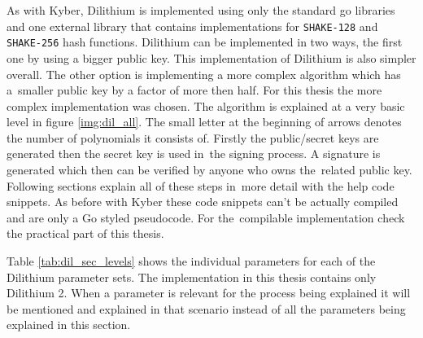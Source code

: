 As with Kyber, Dilithium is implemented using only the standard go libraries and one external library \cite{00fV2cvg7Z6H2tS3} that contains implementations for \texttt{SHAKE-128} and \texttt{SHAKE-256} hash functions. Dilithium can be implemented in two ways, the first one by using a bigger public key. This implementation of Dilithium is also simpler overall. The other option is implementing a more complex algorithm which has a~smaller public key by a factor of more then half. For this thesis the more complex implementation was chosen. The algorithm is explained at a very basic level in figure \ref{img:dil_all}. The small letter at the beginning of arrows denotes the number of polynomials it consists of. Firstly the public/secret keys are generated then the secret key is used in~the signing process. A signature is generated which then can be verified by anyone who owns the~related public key. Following sections explain all of these steps in~more detail with the help code snippets. As before with Kyber these code snippets can't be actually compiled and are only a Go styled pseudocode. For the~compilable implementation check the practical part of this thesis.


Table \ref{tab:dil_sec_levels} shows the individual parameters for each of the Dilithium parameter sets. The implementation in this thesis contains only Dilithium 2. When a parameter is relevant for the process being explained it will be mentioned and explained in that scenario instead of all the parameters being explained in this section.
